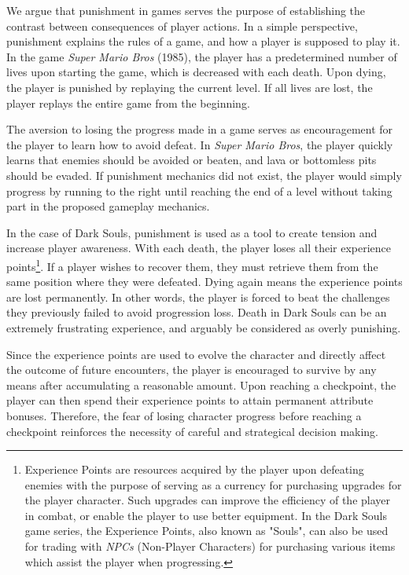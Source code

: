 We argue that punishment in games serves the purpose of establishing the contrast between consequences of player actions. In a simple perspective, punishment explains the rules of a game, and how a player is supposed to play it. In the game \emph{Super Mario Bros} (1985), the player has a predetermined number of lives upon starting the game, which is decreased with each death. Upon dying, the player is punished by replaying the current level. If all lives are lost, the player replays the entire game from the beginning.

The aversion to losing the progress made in a game serves as encouragement for the player to learn how to avoid defeat. In \emph{Super Mario Bros}, the player quickly learns that enemies should be avoided or beaten, and lava or bottomless pits should be evaded. If punishment mechanics did not exist, the player would simply progress by running to the right until reaching the end of a level without taking part in the proposed gameplay mechanics.

In the case of Dark Souls, punishment is used as a tool to create tension and increase player awareness. With each death, the player loses all their experience points\footnote{Experience Points are resources acquired by the player upon defeating enemies with the purpose of serving as a currency for purchasing upgrades for the player character. Such upgrades can improve the efficiency of the player in combat, or enable the player to use better equipment. In the Dark Souls game series, the Experience Points, also known as "Souls", can also be used for trading with \emph{NPCs} (Non-Player Characters) for purchasing various items which assist the player when progressing.}. If a player wishes to recover them, they must retrieve them from the same position where they were defeated. Dying again means the experience points are lost permanently. In other words, the player is forced to beat the challenges they previously failed to avoid progression loss. Death in Dark Souls can be an extremely frustrating experience, and arguably be considered as overly punishing.

Since the experience points are used to evolve the character and directly affect the outcome of future encounters, the player is encouraged to survive by any means after accumulating a reasonable amount. Upon reaching a checkpoint, the player can then spend their experience points to attain permanent attribute bonuses. Therefore, the fear of losing character progress before reaching a checkpoint reinforces the necessity of careful and strategical decision making.

